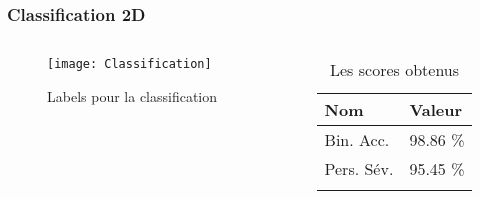
\begin{frame}
    \frametitle{Classification 2D}
    \begin{columns}
        \begin{column}{0.65\textwidth}
            \begin{figure}
            \texttt{[image: Classification]}       
            \caption{Labels pour la classification}
            \end{figure}
         \end{column}
         \pause
         \begin{column}{0.35\textwidth}
            \begin{table}[h!]
                \caption{Les scores obtenus}
                \centering
                \begin{tabular}{l l}
                \toprule
                \textbf{Nom} & \textbf{Valeur} \\
                \midrule
                Bin. Acc. & 98.86 \%\\
                Pers. Sév. & 95.45 \%\\
                \bottomrule\\
                \end{tabular}
            \end{table}
         \end{column}
    \end{columns}
\end{frame}


% 

